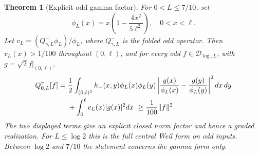 \documentclass[11pt]{article}
\numberwithin{equation}{section}
\newtheorem{theorem}{Theorem}[section]
\theoremstyle{definition}
\theoremstyle{remark}
\newcommand{\DD}{\mathcal D}
\newcommand{\norm}[1]{\lVert#1\rVert}
\newcommand{\Qgam}{Q^{\gamma}}
\begin{document}
\begin{theorem}[Explicit odd gamma factor]\label{thm:oddcompletion}
For $0<L\leq7/10$, set
\begin{equation}
\phi_L(x)=x\left(1-\frac{4x^2}{5\ell^2}\right),\quad 0<x<\ell.
\label{eq:cubicphi}
\end{equation}
Let $v_L=(Q^-_{\gamma,L}\phi_L)/\phi_L$, where $Q^-_{\gamma,L}$
is the folded odd operator. Then $v_L(x)>1/100$ throughout $(0,\ell)$,
and for every odd $f\in\DD_{\log,L}$, with $g=\sqrt2 f|_{(0,\ell)}$,
\begin{align}
\Qgam_{0,L}[f]={}&\frac12\int_{(0,\ell)^2}
 h_-(x,y)\phi_L(x)\phi_L(y)
 \left|\frac{g(x)}{\phi_L(x)}-\frac{g(y)}{\phi_L(y)}\right|^2dx\,dy
 \notag\\
&+\int_0^\ell v_L(x)|g(x)|^2dx
\ \geq\frac1{100}\norm f^2.
\label{eq:oddfactor}
\end{align}
The two displayed terms give an explicit closed norm factor and hence a
graded realization. For $L\leq\log2$ this is the full central Weil form
on odd inputs. Between $\log2$ and $7/10$ the statement concerns the gamma
form only.
\end{theorem}
\end{document}

